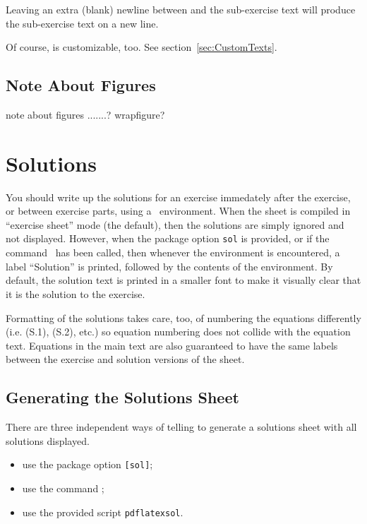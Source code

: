 \documentclass[11pt,a4paper]{article}
\begin{document}
\begin{pkgtip}
  Leaving an extra (blank) newline between  and the sub-exercise text
  will produce the sub-exercise text on a new line.
\end{pkgtip}

\begin{pkgtip}
  Of course,  is customizable, too. See section~\ref{sec:CustomTexts}.
\end{pkgtip}

\subsection{Note About Figures}

note about figures .......?
wrapfigure?


\section{Solutions}
\label{sec:Solutions}

You should write up the solutions for an exercise immedately after the exercise, or
between exercise parts, using
a~ environment. When the sheet is compiled in ``exercise sheet'' mode
(the default), then the solutions are simply ignored and not displayed. However, when the
package option {\tt sol} is provided, or if the command~
has been called, then whenever the environment  is encountered, a label
``Solution'' is printed, followed by the contents of the environment. By default, the
solution text is printed in a smaller font to make it visually clear that it is the
solution to the exercise.

Formatting of the solutions takes care, too, of numbering the equations differently
(i.e. (S.1), (S.2), etc.) so equation numbering does not collide with the equation
text. Equations in the main text are also guaranteed to have the same
labels between the exercise and solution versions of the sheet.

\subsection{Generating the Solutions Sheet}

There are three independent ways of telling \ethuebung{} to generate a solutions sheet
with all solutions displayed.
\begin{itemize}
\item use the package option \texttt{[sol]};
\item use the command ;
\item use the provided script \texttt{pdflatexsol}.
\end{itemize}
\end{document}
